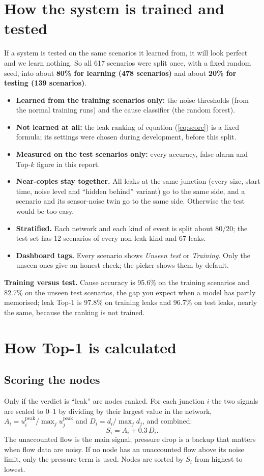 \documentclass[11pt,a4paper]{article}
\begin{document}
\section{How the system is trained and tested}\label{sec:split}
If a system is tested on the same scenarios it learned from, it will look perfect and we learn nothing. So all 617 scenarios were split once, with a fixed random seed, into about \textbf{80\% for learning (478 scenarios)} and about \textbf{20\% for testing (139 scenarios)}.
\begin{itemize}[leftmargin=*,itemsep=2pt]
\item \textbf{Learned from the training scenarios only:} the noise thresholds (from the normal training runs) and the cause classifier (the random forest).
\item \textbf{Not learned at all:} the leak ranking of equation (\ref{eq:score}) is a fixed formula; its settings were chosen during development, before this split.
\item \textbf{Measured on the test scenarios only:} every accuracy, false-alarm and Top-$k$ figure in this report.
\item \textbf{Near-copies stay together.} All leaks at the same junction (every size, start time, noise level and ``hidden behind'' variant) go to the same side, and a scenario and its sensor-noise twin go to the same side. Otherwise the test would be too easy.
\item \textbf{Stratified.} Each network and each kind of event is split about 80/20; the test set has 12 scenarios of every non-leak kind and 67 leaks.
\item \textbf{Dashboard tags.} Every scenario shows \emph{Unseen test} or \emph{Training}. Only the unseen ones give an honest check; the picker shows them by default.
\end{itemize}
\textbf{Training versus test.} Cause accuracy is 95.6\% on the training scenarios and 82.7\% on the unseen test scenarios, the gap you expect when a model has partly memorised; leak Top-1 is 97.8\% on training leaks and 96.7\% on test leaks, nearly the same, because the ranking is not trained.

\section{How Top-1 is calculated}
\subsection{Scoring the nodes}
Only if the verdict is ``leak'' are nodes ranked. For each junction $i$ the two signals are scaled to 0--1 by dividing by their largest value in the network, $A_i=u_i^{\text{peak}}/\max_j u_j^{\text{peak}}$ and $D_i=d_i/\max_j d_j$, and combined:
\begin{equation}\label{eq:score}
S_i=A_i+0.3\,D_i .
\end{equation}
The unaccounted flow is the main signal; pressure drop is a backup that matters when flow data are noisy. If no node has an unaccounted flow above its noise limit, only the pressure term is used. Nodes are sorted by $S_i$ from highest to lowest.
\end{document}
